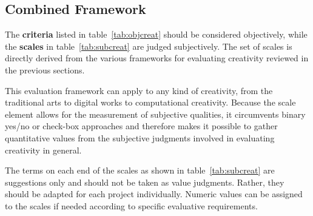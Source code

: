 %
%
%


\subsection{Combined Framework}
\label{s:framework}

The \textbf{criteria} listed in table~\ref{tab:objcreat} should be considered objectively, while the \textbf{scales} in table~\ref{tab:subcreat} are judged subjectively. The set of scales is directly derived from the various frameworks for evaluating creativity reviewed in the previous sections.

This evaluation framework can apply to any kind of creativity, from the traditional arts to digital works to computational creativity. Because the scale element allows for the measurement of subjective qualities, it circumvents binary yes/no or check-box approaches and therefore makes it possible to gather quantitative values from the subjective judgments involved in evaluating creativity in general.

The terms on each end of the scales as shown in table~\ref{tab:subcreat} are suggestions only and should not be taken as value judgments. Rather, they should be adapted for each project individually. Numeric values can be assigned to the scales if needed according to specific evaluative requirements.


